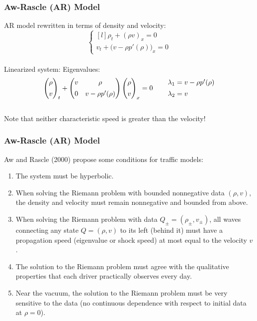\documentclass{beamer}
\begin{document}
\begin{frame}
\frametitle{Aw-Rascle (AR) Model}

AR model rewritten in terms of density and velocity: \\[1ex]

\[ \left\{ \begin{matrix*}[l] \rho_t + (\rho v)_x = 0 \\[2ex] v_t + \Big( v - \rho p'(\rho) \Big)_x = 0 \end{matrix*} \right. \] \\[3ex]

\hspace{5em} Linearized system: \hspace{7em} Eigenvalues:
\[ \begin{pmatrix} \rho \\[1ex] v \end{pmatrix}_t + \begin{pmatrix} v & \rho \\[1ex] 0 & v - \rho p'(\rho)  \end{pmatrix} \begin{pmatrix} \rho \\[1ex] v \end{pmatrix}_x = 0 \hspace{5ex} \begin{matrix*}[l] \lambda_1 = v - \rho p'(\rho) \\[1ex] \lambda_2 = v \end{matrix*} \] \\[1ex]

Note that neither characteristic speed is greater than the velocity!

\end{frame}

\begin{frame}
\frametitle{Aw-Rascle (AR) Model}

Aw and Rascle (2000) propose some conditions for traffic models:
\begin{enumerate}
\item The system must be hyperbolic.
\item When solving the Riemann problem with bounded nonnegative data $(\rho, v)$, the density and velocity must remain nonnegative and bounded from above.
\item When solving the Riemann problem with data $Q_{\pm} = (\rho_{\pm}, v_{\pm})$, all waves connecting any state $Q = (\rho, v)$ to its left (behind it) must have a propagation speed (eigenvalue or shock speed) at most equal to the velocity $v$.  
\item The solution to the Riemann problem must agree with the qualitative properties that each driver practically observes every day.
\item Near the vacuum, the solution to the Riemann problem must be very sensitive to the data (no continuous dependence with respect to initial data at $\rho = 0$). 
\end{enumerate}

\end{frame}
\end{document}
